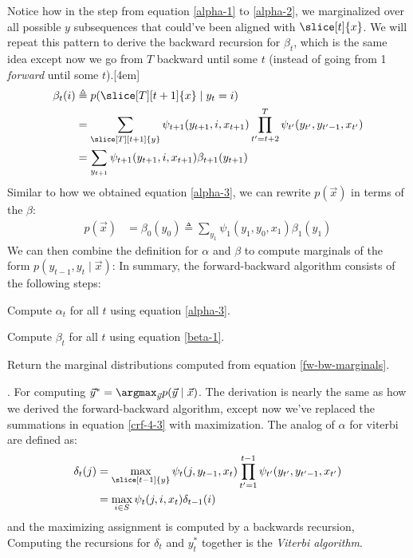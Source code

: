 \documentclass[11pt]{article}
\begin{document}
Notice how in the step from equation \ref{alpha-1} to \ref{alpha-2}, we marginalized over all possible $y$ subsequences that could've been aligned with $\slice[t]{x}$. We will repeat this pattern to derive the backward recursion for $\beta_t$, which is the same idea except now we go from $T$ backward until some $t$ (instead of going from 1 \textit{forward} until some $t$).[4em]
\begin{align}
\beta_t(i) &\triangleq p(\slice[T][t+1]{x} \mid y_t = i) \\
&= \sum_{\slice[T][t+1]{y}} \psi_{t + 1}(y_{t + 1}, i, x_{t + 1}) \prod_{t' = t+2}^{T} \psi_{t'}(y_{t'}, y_{t'-1}, x_{t'}) \\
&= \sum_{y_{t + 1}} \psi_{t + 1}(y_{t + 1}, i, x_{t + 1}) \beta_{t+1}(y_{t + 1})
\end{align}
Similar to how we obtained equation \ref{alpha-3}, we can rewrite $p(\vec x)$ in terms of the $\beta$:
\begin{align}
p(\vec x) &= \beta_0(y_0) \triangleq \sum_{y_1} \psi_1(y_1,  y_0, x_1) \beta_1(y_1) \label{beta-1}
\end{align}
We can then combine the definition for $\alpha$ and $\beta$ to compute marginals of the form $p(y_{t - 1}, y_t \mid \vec{x})$:
In summary, the forward-backward algorithm consists of the following steps:
\begin{compactenum}
	\item Compute $\alpha_t$ for all $t$ using equation \ref{alpha-3}. 
	\item Compute $\beta_t$ for all $t$ using equation \ref{beta-1}. 
	\item Return the marginal distributions computed from equation \ref{fw-bw-marginals}. 
\end{compactenum}

\myspace
\p {}. For computing $\vec{y}^* = \argmax_{\vec y} p(\vec y \mid \vec x)$. The derivation is nearly the same as how we derived the forward-backward algorithm, except now we've replaced the summations in equation \ref{crf-4-3} with maximization. The analog of $\alpha$ for viterbi are defined as:
\begin{align}
\delta_t(j) &= \max_{\slice[t-1]{y}} \psi_t(j, y_{t -1}, x_t) \prod_{t' = 1}^{t - 1} \psi_{t'}(y_{t'}, y_{t' - 1}, x_{t'}) \\
&= \max_{i \in S} \psi_t(j, i, x_t) \delta_{t - 1}(i)
\end{align}
and the maximizing assignment is computed by a backwards recursion,
Computing the recursions for $\delta_t$ and $y_t^*$ together is the \textit{Viterbi algorithm}. 
\end{document}
